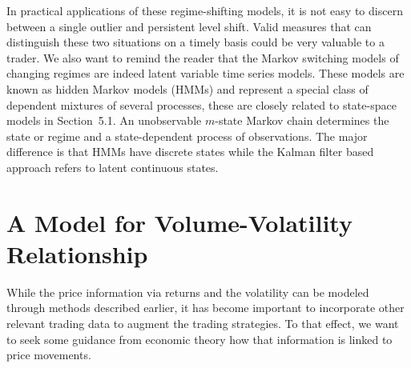 In practical applications of these regime-shifting models, it is not easy to discern between a single outlier and persistent level shift. Valid measures that can distinguish these two situations on a timely basis could be very valuable to a trader. We also want to remind the reader that the Markov switching models of changing regimes are indeed latent variable time series models. These models are known as hidden Markov models (HMMs) and represent a special class of dependent mixtures of several processes, these are closely related to state-space models in Section~5.1. An unobservable $m$-state Markov chain determines the state or regime and a state-dependent process of observations. The major difference is that HMMs have discrete states while the Kalman filter based approach refers to latent continuous states. 



\section{A Model for Volume-Volatility Relationship \label{s:model_volvol_rel}} \label{in:volvol1}

While the price information via returns and the volatility can be modeled through methods described earlier, it has become important to incorporate other relevant trading data to augment the trading strategies. To that effect, we want to seek some guidance from economic theory how that information is linked to price movements.


